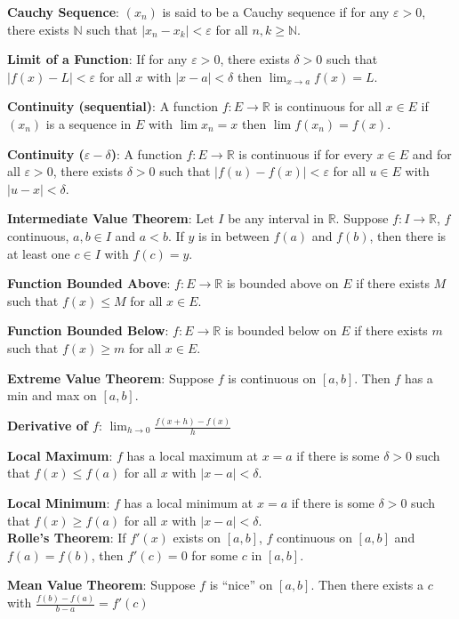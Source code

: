 \documentclass[12pt]{article}
\newcommand{\reals}{\mathbb{R}}
\newcommand{\nats}{\mathbb{N}}
\newcommand{\entry}[1]{\textbf{#1}: } %
\begin{document}
\begin{multicols}{0}
\entry{Cauchy Sequence}{$(x_n)$ is said to be a Cauchy sequence if for any $\varepsilon > 0$, there exists $\nats$ such that $|x_n - x_k| < \varepsilon$ for all $n,k \geq \nats$. }

\entry{Limit of a Function}{If for any $\varepsilon > 0$, there exists $\delta > 0$ such that $|f(x) - L| < \varepsilon$ for all $x$ with $|x - a| < \delta$ then $\lim_{x\to a} f(x) = L$.}

\entry{Continuity (sequential)}{A function $f: E \to \reals$ is continuous for all $x \in E$ if $(x_n)$ is a sequence in $E$ with $\lim x_n = x$ then $\lim f(x_n) = f(x)$.}

\entry{Continuity ($\varepsilon-\delta$)}{A function $f: E \to \reals$ is continuous if for every $x \in E$ and for all $\varepsilon > 0$, there exists $\delta > 0$ such that $|f(u) - f(x)| < \varepsilon$ for all $u \in E$ with $|u - x| < \delta$.}

\entry{Intermediate Value Theorem} {Let $I$ be any interval in $\reals$. Suppose $f: I \to \reals$, $f$ continuous, $a,b \in I$ and $a<b$. If $y$ is in between $f(a)$ and $f(b)$, then there is at least one $c \in I$ with $f(c) = y$.}

\entry{Function Bounded Above}{$f: E \to \reals$ is bounded above on $E$ if there exists $M$ such that $f(x) \leq M$ for all $x \in E$.}

\entry{Function Bounded Below}{$f: E \to \reals$ is bounded below on $E$ if there exists $m$ such that $f(x) \geq m$ for all $x \in E$.}

\entry{Extreme Value Theorem}{Suppose $f$ is continuous on $[a,b]$. Then $f$ has a min and max on $[a,b]$.}

\entry{Derivative of $f$}{$\lim_{h\to 0} \frac{f(x+h)-f(x)}{h}$}

\entry{Local Maximum}{$f$ has a local maximum at $x=a$ if there is some $\delta > 0$ such that  $f(x) \leq f(a)$ for all $x$ with $|x-a| < \delta$. }

\entry{Local Minimum}{$f$ has a local minimum at $x=a$ if there is some $\delta > 0$ such that $f(x) \geq f(a)$ for all $x$ with $|x-a| < \delta$.}\\

\entry{Rolle's Theorem}{If $f'(x)$ exists on $[a,b]$, $f$ continuous on $[a,b]$ and $f(a) = f(b)$, then $f'(c) = 0$ for some $c$ in $[a,b]$.}

\entry{Mean Value Theorem}{Suppose $f$ is ``nice'' on $[a,b]$. Then there exists a $c$ with $\frac{f(b) - f(a)}{b-a} = f'(c)$}


\end{multicols}
\end{document}
